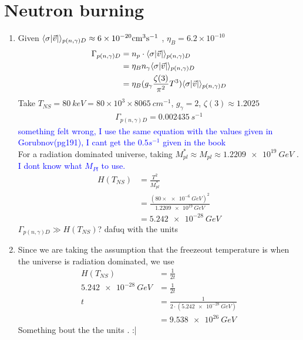 \section{Neutron burning}
\begin{enumerate}[label=\alph*)]
\item Given $\langle\sigma \abs{\vec{v}} \rangle_{p(n,\gamma)D} \approx 6\times\SI{}{10^{-20} cm^3 s^{-1}}$ , $\eta_B = 6.2 \times 10^{-10}$
\begin{align}
\Gamma_{p(n,\gamma)D} &= n_p \cdot \langle\sigma \abs{\vec{v}} \rangle_{p(n,\gamma)D} \\
	&= \eta_B n_\gamma  \langle\sigma \abs{\vec{v}} \rangle_{p(n,\gamma)D} \nonumber \\ 
	&= \eta_B (g_\gamma \frac{\zeta(3)}{\pi^2}T^3)\langle\sigma \abs{\vec{v}} \rangle_{p(n,\gamma)D} \nonumber
\end{align}
Take $T_{NS} = \SI{80}{keV} =  80 \times 10^3 \times 8065\SI{}{cm^{-1}} $, $g_\gamma = 2$, $\zeta(3) \approx 1.2025$
\begin{align}
\Gamma_{p(n,\gamma)D} = \SI{0.002435}{s^{-1}} 
\end{align}
\textcolor{blue}{something felt wrong, I use the same equation with the values given in Gorubnov(pg191), I cant get the $0.5s^{-1}$ given in the book}\\
For a radiation dominated universe, taking $M^{\ast}_{pl} \approx M_{pl} \approx \SI{1.2209 e19}{GeV}$ . \textcolor{blue}{I dont know what $M_{Pl}$ to use.}
\begin{align}
H(T_{NS}) 	&= \frac{T^2}{M^{\ast}_{pl}} \nonumber \\
	&= \frac{(80\times \SI{e-6}{GeV})^2}{\SI{1.2209 e19}{GeV}} \nonumber  \\
	&= \SI{5.242e-28}{GeV}
\end{align}
$\Gamma_{p(n,\gamma)D} \gg H(T_{NS})$? dafuq with the units 
\item Since we are taking the assumption that the freezeout temperature is when the universe is radiation dominated, we use 
\begin{align}
H(T_{NS}) 	&= \frac{1}{2t} \\
\SI{5.242e-28}{GeV}	&=  \frac{1}{2t} \nonumber  \\
	t	&=  \frac{1}{2 \cdot (\SI{5.242e-28}{GeV})} \nonumber  \\
		&=   \SI{9.538e26}{GeV}\nonumber  
\end{align}
Something bout the the units . :|
\end{enumerate}

